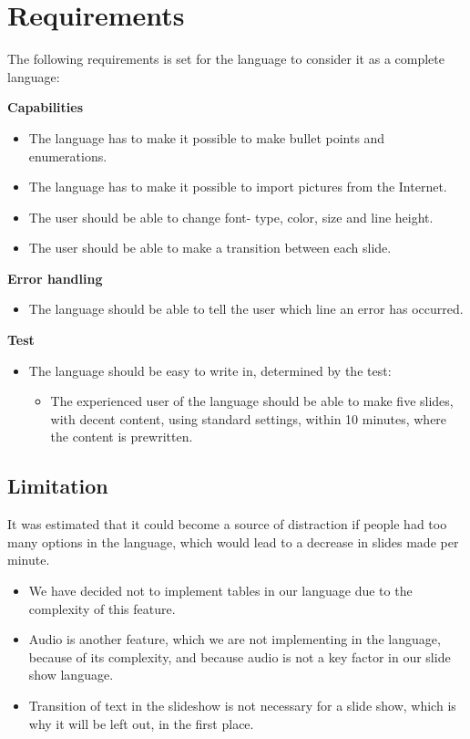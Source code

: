 \section{Requirements}
The following requirements is set for the language to consider it as a complete language:

\textbf{Capabilities}\\
\begin{itemize}
\item The language has to make it possible to make bullet points and enumerations.
\item The language has to make it possible to import pictures from the Internet.
\item The user should be able to change font- type, color, size and line height.
\item The user should be able to make a transition between each slide. 
\end{itemize}
\textbf{Error handling}\\
\begin{itemize}
\item The language should be able to tell the user which line an error has occurred. 
\end{itemize}
\textbf{Test}\\
\begin{itemize}
\item The language should be easy to write in, determined by the test:
\begin{itemize}
\item The experienced user of the language should be able to make five slides, with decent content, using standard settings, within 10 minutes, where the content is prewritten.
\end{itemize}
\end{itemize}

\subsection*{Limitation}

It was estimated that it could become a source of distraction if people had too many options in the language, which would lead to a decrease in slides made per minute.
\begin{itemize}
\item We have decided not to implement tables in our language due to the complexity of this feature.
\item Audio is another feature, which we are not implementing in the language, because of its complexity, and because audio is not a key factor in our slide show language.
\item Transition of text in the slideshow is not necessary for a slide show, which is why it will be left out, in the first place.
\end{itemize}